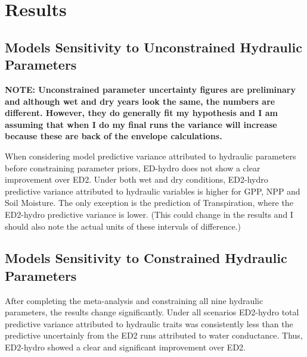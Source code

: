\newpage
{}
\section*{Results}


\subsection*{Models Sensitivity to Unconstrained Hydraulic Parameters}

\textbf{NOTE: Unconstrained parameter uncertainty figures are preliminary and although wet and dry years look the same, the numbers are different. However, they do generally fit my hypothesis and I am assuming that when I do my final runs the variance will increase because these are back of the envelope calculations.}

When considering model predictive variance attributed to hydraulic parameters before constraining parameter priors, ED-hydro does not show a clear improvement over ED2. Under both wet and dry conditions, ED2-hydro predictive variance attributed to hydraulic variables is higher for GPP, NPP and Soil Moisture. The only exception is the prediction of Transpiration, where the ED2-hydro predictive variance is lower. (This could change in the results and I should also note the actual units of these intervals of difference.) 

\subsection*{Models Sensitivity to Constrained Hydraulic Parameters} 

After completing the meta-analysis and constraining all nine hydraulic parameters, the results change significantly.  Under all scenarios ED2-hydro total predictive variance attributed to hydraulic traits was consistently less than the predictive uncertainly from the ED2 runs attributed to water conductance. Thus, ED2-hydro showed a clear and significant improvement over ED2. 



